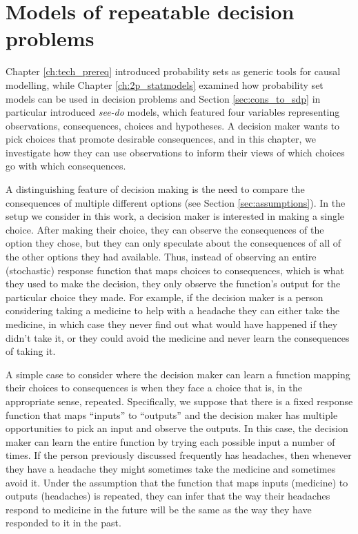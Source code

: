 
\chapter[Repeatable decision problems]{Models of repeatable decision problems}\label{ch:evaluating_decisions}

Chapter \ref{ch:tech_prereq} introduced probability sets as generic tools for causal modelling, while Chapter \ref{ch:2p_statmodels} examined how probability set models can be used in decision problems and Section \ref{sec:cons_to_sdp} in particular introduced \emph{see-do} models, which featured four variables representing observations, consequences, choices and hypotheses. A decision maker wants to pick choices that promote desirable consequences, and in this chapter, we investigate how they can use observations to inform their views of which choices go with which consequences.

A distinguishing feature of decision making is the need to compare the consequences of multiple different options (see Section \ref{sec:assumptions}). In the setup we consider in this work, a decision maker is interested in making a single choice. After making their choice, they can observe the consequences of the option they chose, but they can only speculate about the consequences of all of the other options they had available. Thus, instead of observing an entire (stochastic) response function that maps choices to consequences, which is what they used to make the decision, they only observe the function's output for the particular choice they made. For example, if the decision maker is a person considering taking a medicine to help with a headache they can either take the medicine, in which case they never find out what would have happened if they didn't take it, or they could avoid the medicine and never learn the consequences of taking it.

A simple case to consider where the decision maker can learn a function mapping their choices to consequences is when they face a choice that is, in the appropriate sense, repeated. Specifically, we suppose that there is a fixed response function that maps ``inputs'' to ``outputs'' and the decision maker has multiple opportunities to pick an input and observe the outputs. In this case, the decision maker can learn the entire function by trying each possible input a number of times. If the person previously discussed frequently has headaches, then whenever they have a headache they might sometimes take the medicine and sometimes avoid it. Under the assumption that the function that maps inputs (medicine) to outputs (headaches) is repeated, they can infer that the way their headaches respond to medicine in the future will be the same as the way they have responded to it in the past.

